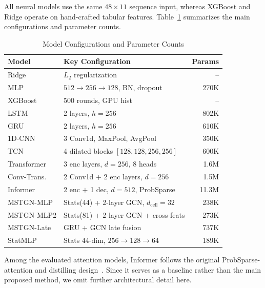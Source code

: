 \documentclass[conference]{IEEEtran}
\begin{document}
All neural models use the same $48 \times 11$ sequence input, whereas XGBoost and Ridge operate on hand-crafted tabular features. Table~\ref{tab:model_configs} summarizes the main configurations and parameter counts.

\begin{table}[t]
    \centering
    \caption{Model Configurations and Parameter Counts}
    \label{tab:model_configs}
    \begin{tabular}{llr}
        \toprule
        \textbf{Model} & \textbf{Key Configuration} & \textbf{Params} \\
        \midrule
        Ridge & $L_2$ regularization & -- \\
        MLP & $512{\to}256{\to}128$, BN, dropout & 270K \\
        XGBoost & 500 rounds, GPU hist & -- \\
        \midrule
        LSTM & 2 layers, $h{=}256$ & 802K \\
        GRU & 2 layers, $h{=}256$ & 610K \\
        \midrule
        1D-CNN & 3 Conv1d, MaxPool, AvgPool & 350K \\
        TCN & 4 dilated blocks $[128,128,256,256]$ & 600K \\
        \midrule
        Transformer & 3 enc layers, $d{=}256$, 8 heads & 1.6M \\
        Conv-Trans. & 2 Conv1d $+$ 2 enc layers, $d{=}256$ & 1.5M \\
        Informer & 2 enc $+$ 1 dec, $d{=}512$, ProbSparse & 11.3M \\
        \midrule
        MSTGN-MLP & Stats(44) + 2-layer GCN, $d_\text{cell}{=}32$ & 238K \\
        MSTGN-MLP2 & Stats(81) + 2-layer GCN + cross-feats & 273K \\
        MSTGN-Late & GRU + GCN late fusion & 737K \\
        StatMLP & Stats 44-dim, $256{\to}128{\to}64$ & 189K \\
        \bottomrule
    \end{tabular}
\end{table}

Among the evaluated attention models, Informer follows the original ProbSparse-attention and distilling design~\cite{zhou2021informer}. Since it serves as a baseline rather than the main proposed method, we omit further architectural detail here.

\end{document}
